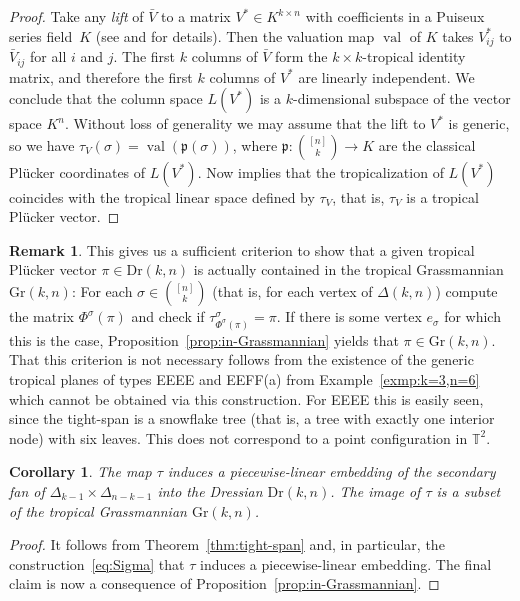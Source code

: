 \documentclass[11pt,a4paper]{amsart}
\newcommand{\frp}{\mathfrak{p}}
\DeclareMathOperator{\val}{val}
\newcommand{\Hypersimplex}[2]{{\Delta(#1,#2)}}
\newcommand{\TT}{{\mathbb{T}}}
\newcommand{\Gr}[2]{{\mathrm{Gr}(#1,#2)}}
\newcommand{\Dr}[2]{{\mathrm{Dr}(#1,#2)}}
\theoremstyle{plain}
\newtheorem{corollary}[theorem]{Corollary}
\theoremstyle{definition}
\newtheorem{remark}[theorem]{Remark}
\begin{document}
\begin{proof}
  Take any \emph{lift} of $\bar V$ to a matrix $V^*\in K^{k\times n}$ with coefficients in a Puiseux
  series field~$K$ (see \cite[Sec.~4]{TLS} and \cite{Markwig07} for details).  Then the
  valuation map $\val$ of $K$ takes $V^*_{ij}$ to $\bar V_{ij}$ for all $i$ and $j$.  The first $k$
  columns of $\bar V$ form the $k{\times}k$-tropical identity matrix, and therefore the first $k$
  columns of $V^*$ are linearly independent.  We conclude that the column space $L(V^*)$ is a
  $k$-dimensional subspace of the vector space $K^n$. Without loss of generality we may assume that
  the lift to $V^*$ is generic, so we have $\tau_V(\sigma)=\val(\frp(\sigma))$, where
  $\frp:\binom{[n]}k\to K$ are the classical Pl\"ucker coordinates of $L(V^*)$. Now
  \cite[Prop.~4.2]{TLS} implies that the tropicalization of $L(V^*)$ coincides with the
  tropical linear space defined by $\tau_V$, that is, $\tau_V$ is a tropical Pl\"ucker
  vector.
\end{proof}

\begin{remark}
  This gives us a sufficient criterion to show that a given tropical Pl\"ucker vector $\pi\in \Dr
  kn$ is actually contained in the tropical Grassmannian $\Gr kn$: For each $\sigma \in
  \binom{[n]}k$ (that is, for each vertex of $\Hypersimplex kn$) compute the matrix
  $\Phi^\sigma(\pi)$ and check if $\tau^\sigma_{\Phi^\sigma(\pi)}=\pi$. If there is some vertex
  $e_\sigma$ for which this is the case, Proposition~\ref{prop:in-Grassmannian} yields that $\pi\in
  \Gr kn$. That this criterion is not necessary follows from the existence of the generic tropical
  planes of types EEEE and EEFF(a) from Example~\ref{exmp:k=3,n=6} which cannot be obtained via this
  construction.  For EEEE this is easily seen, since the tight-span is a snowflake tree (that is, a
  tree with exactly one interior node) with six leaves.  This does not correspond to a point
  configuration in $\TT^2$.
\end{remark}

\begin{corollary}\label{cor:embedding}
  The map $\tau$ induces a piecewise-linear embedding of the secondary fan of
  $\Delta_{k-1}\times\Delta_{n-k-1}$ into the Dressian $\Dr{k}{n}$.  The image of $\tau$ is a subset
  of the tropical Grassmannian $\Gr{k}{n}$.
\end{corollary}

\begin{proof}
  It follows from Theorem~\ref{thm:tight-span} and, in particular, the construction~\eqref{eq:Sigma}
  that $\tau$ induces a piecewise-linear embedding.  The final claim is now a consequence of
  Proposition~\ref{prop:in-Grassmannian}.
\end{proof}
\end{document}

